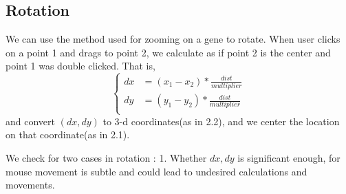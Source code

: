 \documentclass[]{article}
\begin{document}
 \subsection{Rotation}

We can use the method used for zooming on a gene to rotate. When user clicks on a point 1 and drags to point 2, we calculate as if point 2 is the center and point 1 was double clicked. That is,
\[
\begin{cases}
dx &= (x_1 - x_2) * \frac{dist}{multiplier}\\
dy &= (y_1 - y_2) * \frac{dist}{multiplier}\\
\end{cases}
\]
and convert $(dx,dy)$ to 3-d coordinates(as in 2.2), and we center the location on that coordinate(as in 2.1).

We check for two cases in rotation : 
1. Whether $dx,dy$ is significant enough, for mouse movement is subtle and could lead to undesired calculations and movements.
\end{document}
